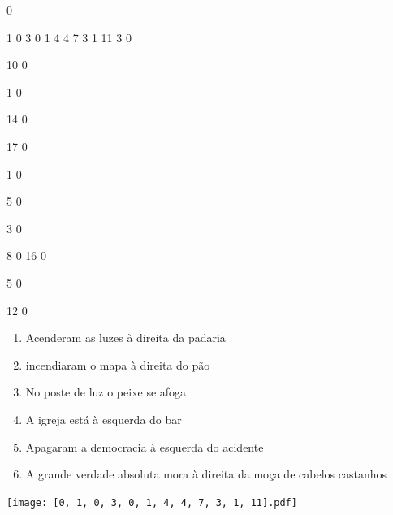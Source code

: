 \documentclass[12pt]{article}
\begin{document}
		\vfill  
		  
{
	0	%

	1	%
	0	%
	3	%
	0	%
	1	%
	4	%
	4	%
	7	%
	3	%
	1	%
	11	%
	3	%
	0	%

	10	%
	0	%

	1	%
	0	%

	14	%
	0	%

	17	%
	0	%

	1	%
	0	%

	5	%
	0	%

	3	%
	0	%

	8	%
	0	%
	16	%
	0	%

	5	%
	0	%

	12	%
	0	%

}	  
		    	

		 

\pagebreak


	\begin{enumerate}
		  \sffamily %
		  \large %


\vfill \item
Acenderam as luzes	%
à direita
da padaria	%

\vfill \item
incendiaram o mapa	%
à direita
do pão	%

\vfill \item
No poste de luz	%
o peixe se afoga	%

\vfill \item
A igreja está	%
à esquerda
do bar	%

\vfill \item
Apagaram a democracia	%
à esquerda
do acidente	%

\vfill \item
A grande verdade absoluta mora	%
à direita
da moça de cabelos castanhos	%
	\end{enumerate}
		  
		  \hfill

		  \vfill

\texttt{[image: [0, 1, 0, 3, 0, 1, 4, 4, 7, 3, 1, 11].pdf]}


	\hfill	  	  
\end{document}
